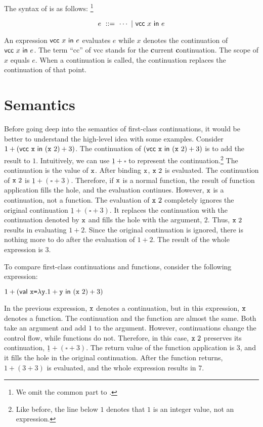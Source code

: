 The syntax of \Lang is as follows:
\footnote{We omit the common part to \plang.}

\[
  e\ ::=\ \cdots\ |\ \evcc{x}{e}
\]

An expression $\textsf{vcc}\ x\ \textsf{in}\ e$ evaluates $e$ while $x$ denotes the
continuation of $\textsf{vcc}\ x\ \textsf{in}\ e$. The term ``\textsf{cc}'' of \textsf{vcc} stands
for the \textbf{\large c}urrent \textbf{\large c}ontinuation.
The scope of $x$ equals $e$. When a continuation
is called, the continuation replaces the continuation of that point.

\section{Semantics}

Before going deep into the semantics of first-class continuations, it would be
better to understand the high-level idea with some examples.
Consider $1+(\textsf{vcc}\ \texttt{x}\ \textsf{in}\ (\texttt{x}\ 2)+3)$. The
continuation of $(\evcc{\cx}{(\cx\ 2)+3})$ is to add the result to
$1$. Intuitively, we can use $\underline{1}+\square$ to represent the
continuation.\footnote{Like before, the line below $1$ denotes that $1$ is an
integer value, not an expression.}
The continuation is the value of $\texttt{x}$. After binding $\texttt{x}$, $\cx\ 2$ is
evaluated. The continuation of $\cx\ 2$ is $\underline{1}+(\square+3)$.
Therefore, if $\texttt{x}$ is a normal function, the result of function application
fills the hole, and the evaluation continues. However, $\texttt{x}$ is a
continuation, not a function. The evaluation of $\cx\ 2$ completely ignores the original
continuation $\underline{1}+(\square+3)$. It replaces the continuation with
the continuation denoted by $\texttt{x}$ and fills the hole with the argument, $2$.
Thus, $\cx\ 2$ results in evaluating $1+2$. Since the original continuation is
ignored, there is nothing more to do after the evaluation of $1+2$. The result
of the whole expression is $3$.

To compare first-class continuations and functions, consider the following
expression:

$1+(\ebind{\cx}{\efun{\cy}{1+\cy}}{(\cx\ 2)+3})$

In the previous expression,
$\texttt{x}$ denotes a continuation, but in this expression, $\texttt{x}$ denotes a function.
The continuation and the function are almost the same. Both take an argument
and add $1$ to the argument. However, continuations change the control flow,
while functions do not. Therefore, in this case, $\cx\ 2$ preserves its continuation,
$\underline{1}+(\square+3)$. The return value of the function application is
$3$, and it fills the hole in the original continuation. After the function
returns, $1+(3+3)$ is evaluated, and the whole expression results in $7$.

